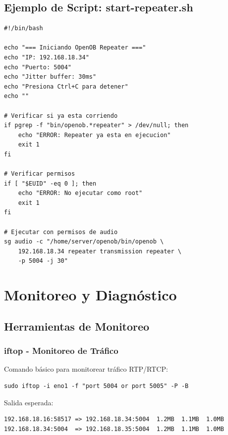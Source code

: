 \documentclass[12pt,a4paper]{article}
\begin{document}
\subsection{Ejemplo de Script: start-repeater.sh}

\begin{lstlisting}[style=bashstyle, caption={Script de inicio del repeater}, label={lst:startrepeater}]
#!/bin/bash

echo "=== Iniciando OpenOB Repeater ==="
echo "IP: 192.168.18.34"
echo "Puerto: 5004"
echo "Jitter buffer: 30ms"
echo "Presiona Ctrl+C para detener"
echo ""

# Verificar si ya esta corriendo
if pgrep -f "bin/openob.*repeater" > /dev/null; then
    echo "ERROR: Repeater ya esta en ejecucion"
    exit 1
fi

# Verificar permisos
if [ "$EUID" -eq 0 ]; then
    echo "ERROR: No ejecutar como root"
    exit 1
fi

# Ejecutar con permisos de audio
sg audio -c "/home/server/openob/bin/openob \
    192.168.18.34 repeater transmission repeater \
    -p 5004 -j 30"
\end{lstlisting}

\newpage

\section{Monitoreo y Diagnóstico}

\subsection{Herramientas de Monitoreo}

\subsubsection{iftop - Monitoreo de Tráfico}

Comando básico para monitorear tráfico RTP/RTCP:

\begin{lstlisting}[style=bashstyle]
sudo iftop -i eno1 -f "port 5004 or port 5005" -P -B
\end{lstlisting}

Salida esperada:

\begin{verbatim}
192.168.18.16:58517 => 192.168.18.34:5004  1.2MB  1.1MB  1.0MB
192.168.18.34:5004  => 192.168.18.35:5004  1.2MB  1.1MB  1.0MB
\end{verbatim}
\end{document}

